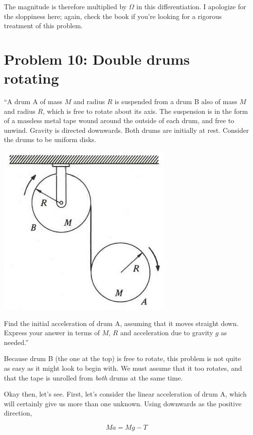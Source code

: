 \documentclass[8.01x]{subfiles}
\begin{document}
The magnitude is therefore multiplied by $\Omega$ in this differentiation. I apologize for the sloppiness here; again, check the book if you're looking for a rigorous treatment of this problem.

\section{Problem 10: Double drums rotating}

``A drum A of mass $M$ and radius $R$ is suspended from a drum B also of mass $M$ and radius $R$, which is free to rotate about its axis. The suspension is in the form of a massless metal tape wound around the outside of each drum, and free to unwind. Gravity is directed downwards. Both drums are initially at rest. Consider the drums to be uniform disks.

\begin{center}
\includegraphics[scale=1.0]{Graphics/h8p10}
\end{center}

Find the initial acceleration of drum A, assuming that it moves straight down. Express your answer in terms of $M$, $R$ and acceleration due to gravity $g$ as needed.''

Because drum B (the one at the top) is free to rotate, this problem is not quite as easy as it might look to begin with. We must assume that it too rotates, and that the tape is unrolled from \emph{both} drums at the same time.

Okay then, let's see. First, let's consider the linear acceleration of drum A, which will certainly give us more than one unknown. Using downwards as the positive direction,

\begin{equation}
M a = M g - T
\end{equation}
\end{document}
